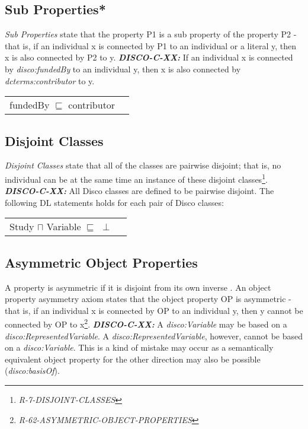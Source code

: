 \documentclass{llncs}
\newenvironment{DL}{
  \vspace{0cm}
  \begin{tabular}{r l}

}{
  \end{tabular}
}
\begin{document}
\subsection{Sub Properties*}

{\em Sub Properties} state that the property P1 is a sub property of the property P2 - that is, if an individual x is connected by P1 to an individual or a literal y, then x is also connected by P2 to y. 
\textbf{{\em DISCO-C-XX:}}
If an individual x is connected by {\em disco:fundedBy} to an individual y, then x is also connected by {\em dcterms:contributor} to y. 

\begin{DL}
fundedBy $\sqsubseteq$ contributor 
\end{DL}

\subsection{Disjoint Classes}

{\em Disjoint Classes} state that all of the classes are pairwise disjoint; 
that is, no individual can be at the same time an instance of these disjoint classes\footnote{{\em R-7-DISJOINT-CLASSES}}.
\textbf{{\em DISCO-C-XX:}} 
All Disco classes are defined to be pairwise disjoint.
The following DL statements holds for each pair of Disco classes:

\begin{DL}
Study $\sqcap$ Variable $\sqsubseteq$ $\perp$\\
\end{DL}

\subsection{Asymmetric Object Properties}

A property is asymmetric if it is disjoint from its own inverse \cite{Kroetzsch2012}.
An object property asymmetry axiom states that the object property OP is asymmetric - that is, if an individual x is connected by OP to an individual y, then y cannot be connected by OP to x\footnote{{\em R-62-ASYMMETRIC-OBJECT-PROPERTIES}}. 
\textbf{{\em DISCO-C-XX:}} 
A {\em disco:Variable} may be based on a {\em disco:RepresentedVariable}.
A {\em disco:RepresentedVariable}, however, cannot be based on a {\em disco:Variable}.
This is a kind of mistake may occur as a semantically equivalent object property for the other direction may also be possible ({\em disco:basisOf}).
\end{document}
